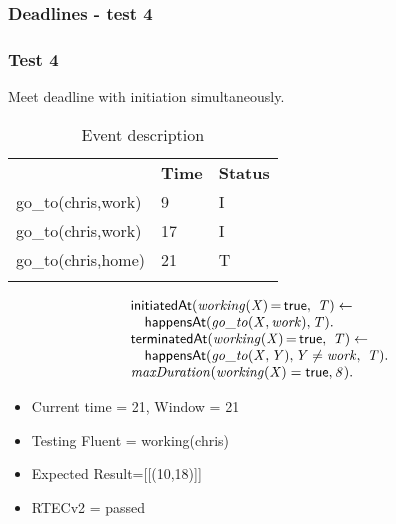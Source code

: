 \documentclass[8pt]{beamer}
\DeclareMathOperator{\val}{=}  %
\def \patsize {}
\def\happensAt{\textsf{\patsize happensAt}}
\def\initiatedAt{\textsf{\patsize initiatedAt}}
\def\terminatedAt{\textsf{\patsize terminatedAt}}
\def\true{\textsf{\patsize true}}
\newenvironment{mysplit}%
  {\arraycolsep 0pt \begin{array}{l}}%
  {\end{array}}
\begin{document}
\begin{frame}
    \frametitle{Deadlines - test 4}
    \subsubsection{Test 4}
    \small
    Meet deadline with initiation simultaneously.\linebreak
    \begin{minipage}{0.48\linewidth}
        \begin{table}[t!]
            \caption{Event description}
            \begin{center}

                \begin{tabular}{lll}
                    \hline\noalign{\smallskip}
                    \multicolumn{1}{l}{\textbf{Event}} & \multicolumn{1}{c}{\textbf{Time}} & \multicolumn{1}{c}{\textbf{Status}} \\
                    go\_to(chris,work)& 9 & I\\
                    go\_to(chris,work)& 17 & I\\
                    go\_to(chris,home)& 21 & T\\
                    \noalign{\smallskip}
                    \hline
                \end{tabular}
            \end{center}
        \end{table}
    \end{minipage}
    \begin{minipage}{0.48\linewidth}
        \begin{align*}
            \begin{mysplit}
                \initiatedAt\mathit{(working(X)\val\true,\ T)\leftarrow}\\
                \quad    \happensAt\mathit{(go\_to(X,work),T)}.\\
                \terminatedAt\mathit{(working(X)\val\true,\ T) \leftarrow}\\
                \quad    \happensAt\mathit{(go\_to(X,Y),Y\neq work,\ T)}.\\
                \mathit{maxDuration(working(X)=\true,8)}.\\
            \end{mysplit}
        \end{align*}
    \end{minipage}
    \begin{itemize}
        \item Current time = 21, Window = 21
        \item Testing Fluent = working(chris)
        \item Expected Result=[[(10,18)]]
        \item RTECv2 = passed
    \end{itemize}
\end{frame}
\end{document}
